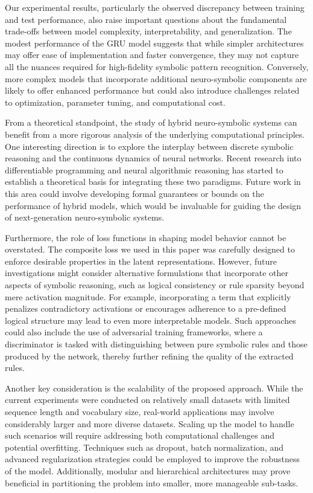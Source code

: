 \documentclass[12pt]{article}
\begin{document}
Our experimental results, particularly the observed discrepancy between training and test performance, also raise important questions about the fundamental trade-offs between model complexity, interpretability, and generalization. The modest performance of the GRU model suggests that while simpler architectures may offer ease of implementation and faster convergence, they may not capture all the nuances required for high-fidelity symbolic pattern recognition. Conversely, more complex models that incorporate additional neuro-symbolic components are likely to offer enhanced performance but could also introduce challenges related to optimization, parameter tuning, and computational cost.

From a theoretical standpoint, the study of hybrid neuro-symbolic systems can benefit from a more rigorous analysis of the underlying computational principles. One interesting direction is to explore the interplay between discrete symbolic reasoning and the continuous dynamics of neural networks. Recent research into differentiable programming and neural algorithmic reasoning has started to establish a theoretical basis for integrating these two paradigms. Future work in this area could involve developing formal guarantees or bounds on the performance of hybrid models, which would be invaluable for guiding the design of next-generation neuro-symbolic systems.

Furthermore, the role of loss functions in shaping model behavior cannot be overstated. The composite loss we used in this paper was carefully designed to enforce desirable properties in the latent representations. However, future investigations might consider alternative formulations that incorporate other aspects of symbolic reasoning, such as logical consistency or rule sparsity beyond mere activation magnitude. For example, incorporating a term that explicitly penalizes contradictory activations or encourages adherence to a pre-defined logical structure may lead to even more interpretable models. Such approaches could also include the use of adversarial training frameworks, where a discriminator is tasked with distinguishing between pure symbolic rules and those produced by the network, thereby further refining the quality of the extracted rules.

Another key consideration is the scalability of the proposed approach. While the current experiments were conducted on relatively small datasets with limited sequence length and vocabulary size, real-world applications may involve considerably larger and more diverse datasets. Scaling up the model to handle such scenarios will require addressing both computational challenges and potential overfitting. Techniques such as dropout, batch normalization, and advanced regularization strategies could be employed to improve the robustness of the model. Additionally, modular and hierarchical architectures may prove beneficial in partitioning the problem into smaller, more manageable sub-tasks.
\end{document}

